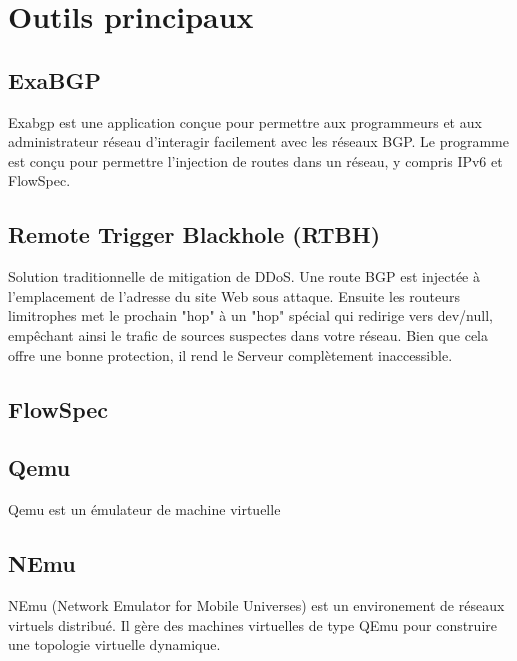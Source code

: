 \section{Outils principaux}

\subsection{ExaBGP}
Exabgp est une application conçue pour permettre aux programmeurs et aux administrateur réseau d’interagir facilement avec les réseaux BGP. Le programme est conçu pour permettre l’injection de routes dans un réseau, y compris IPv6 et FlowSpec.
\cite{Man10}

\subsection{Remote Trigger Blackhole (RTBH)}
Solution traditionnelle de mitigation de DDoS.
Une route BGP est injectée à l'emplacement de l’adresse du site Web sous attaque. Ensuite les routeurs limitrophes  met le prochain "hop" à un "hop" spécial qui redirige vers dev/null, empêchant ainsi le trafic de sources suspectes dans votre réseau. Bien que cela offre une bonne protection, il rend le Serveur complètement inaccessible.





\subsection{FlowSpec}



\subsection{Qemu}

Qemu est un émulateur de machine virtuelle

\subsection{NEmu}
NEmu (Network Emulator for Mobile Universes) est un environement de réseaux virtuels distribué. Il gère des machines virtuelles de type QEmu pour construire une topologie virtuelle dynamique.
